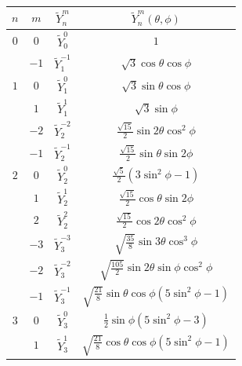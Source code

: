 \begin{table}[h!]
\centering
\begin{tabular}{|cccc|}
\hline
$n$        & $m$ & \rule{0pt}{12pt} $\tilde{Y}_n^m$ & $\tilde{Y}_n^m(\theta,\phi)$ \\ \hline
   $0$               & \rule{0pt}{12pt} $0$           &  $\tilde{Y}_0^0$          & $1$           \\ \hline
\rule{0pt}{12pt}  & $-1$          &  $\tilde{Y}_1^{-1}$          & $\sqrt{3} \cos \theta \cos \phi$         \\
  $1$                &     \rule{0pt}{12pt} $0$      &   $\tilde{Y}_1^0$         &  $\sqrt{3} \sin \theta \cos \phi$    \\
                  &     \rule{0pt}{12pt}  $1$      &  $\tilde{Y}_1^1$          &       $\sqrt{3} \sin \phi$     \\ \hline
 & \rule{0pt}{14pt} $-2$        &  $\tilde{Y}_2^{-2}$          & $\frac{\sqrt{15}}{2} \sin 2 \theta \cos^2 \phi$           \\
                  &    \rule{0pt}{14pt} $-1$        &  $\tilde{Y}_2^{-1}$          &
                  $\frac{\sqrt{15}}{2} \sin \theta \sin 2 \phi$          \\
 $2$                 &  \rule{0pt}{14pt}   $0$       &  $\tilde{Y}_2^{0}$          &   $\frac{\sqrt{5}}{2} (3 \sin^2 \phi -1)$      \\
                  &   \rule{0pt}{14pt}  $1$       &  $\tilde{Y}_2^{1}$          &   $\frac{\sqrt{15}}{2} \cos \theta \sin 2 \phi$         \\
                  &   \rule{0pt}{14pt}  $2$       &  $\tilde{Y}_2^{2}$          &   $\frac{\sqrt{15}}{2} \cos 2 \theta \cos^2 \phi$         \\ \hline
 &  \rule{0pt}{14pt} $-3$            &  $\tilde{Y}_3^{-3}$          & $\sqrt{\frac{35}{8}} \sin 3 \theta \cos^3 \phi$            \\
                  & \rule{0pt}{14pt}  $-2$         &  $\tilde{Y}_3^{-2}$          & $\sqrt{\frac{105}{2}} \sin 2 \theta \sin \phi \cos^2 \phi$            \\
                  & \rule{0pt}{14pt} $-1$           &  $\tilde{Y}_3^{-1}$          & $\sqrt{\frac{21}{8}} \sin \theta \cos \phi (5\sin^2 \phi-1)$           \\
     $3$             &  \rule{0pt}{14pt} $0$         &  $\tilde{Y}_3^{0}$          &  $\frac{1}{2} \sin \phi (5 \sin^2 \phi -3)$          \\
                  &  \rule{0pt}{14pt}  $1$        &  $\tilde{Y}_3^{1}$          & $\sqrt{\frac{21}{8}} \cos \theta \cos \phi (5 \sin^2 \phi-1)$           \\

\end{tabular}
\end{table}
